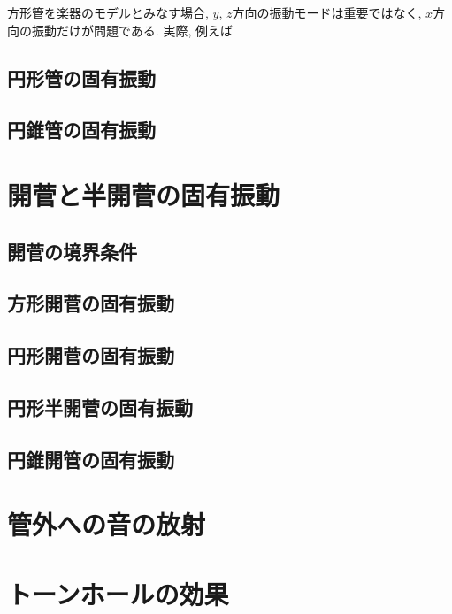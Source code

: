 \documentclass[a4paper,uplatex,dvipdfmx]{jsarticle}
\begin{document}
方形管を楽器のモデルとみなす場合, $y$, $z$方向の振動モードは重要ではなく, $x$方向の振動だけが問題である.
実際, 例えば


\subsection{円形管の固有振動}

\subsection{円錐管の固有振動}


\section{開菅と半開菅の固有振動}

\subsection{開菅の境界条件}

\subsection{方形開菅の固有振動}

\subsection{円形開菅の固有振動}

\subsection{円形半開菅の固有振動}

\subsection{円錐開管の固有振動}


\section{管外への音の放射}


\section{トーンホールの効果}
\end{document}
